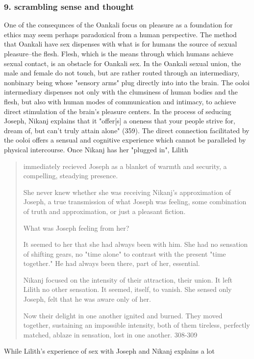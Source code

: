 \documentclass[11pt]{article}
\begin{document}
\subsubsection{9. scrambling sense and thought}
\label{sec:org917540f}
One of the consequnces of the Oankali focus on pleasure as a
foundation for ethics may seem perhaps paradoxical from a human
perspective. The method that Oankali have sex dispenses with what is
for humans the source of sexual pleasure--the flesh. Flesh, which is
the means through which humans achieve sexual contact, is an obstacle
for Oankali sex. In the Oankali sexual union, the male and female do
not touch, but are rather routed through an intermediary, nonbinary
being whose "sensory arms" plug directly into into the brain. The
ooloi intermediary dispenses not only with the clumsiness of human
bodies and the flesh, but also with human modes of communication and
intimacy, to achieve direct stimulation of the brain's pleasure
centers. In the process of seducing Joseph, Nikanj explains that it
"offer[s] a oneness that your people strive for, dream of, but can't
truly attain alone" (359). The direct connection facilitated by the
ooloi offers a sensual and cognitive experience which cannot be
paralleled by physical intercourse. Once Nikanj has her "plugged in",
Lilith
\begin{quote}
immediately recieved Joseph as a blanket of warmth and security, a
compelling, steadying presence. 

She never knew whether she was receiving Nikanj's approximation of
Joseph, a true transmission of what Joseph was feeling, some
combination of truth and approximation, or just a pleasant fiction. 

What was Joseph feeling from her?

It seemed to her that she had always been with him. She had no
sensation of shifting gears, no "time alone" to contrast with the
present "time together." He had always been there, part of her,
essential. 

Nikanj focused on the intensity of their attraction, their union. It
left Lilith no other sensation. It seemed, itself, to vanish. She
sensed only Joseph, felt that he was aware only of her. 

Now their delight in one another ignited and burned. They moved
together, sustaining an impossible intensity, both of them tireless,
perfectly matched, ablaze in sensation, lost in one another. 308-309
\end{quote}
While Lilith's experience of sex with Joseph and Nikanj explains a lot
\end{document}
